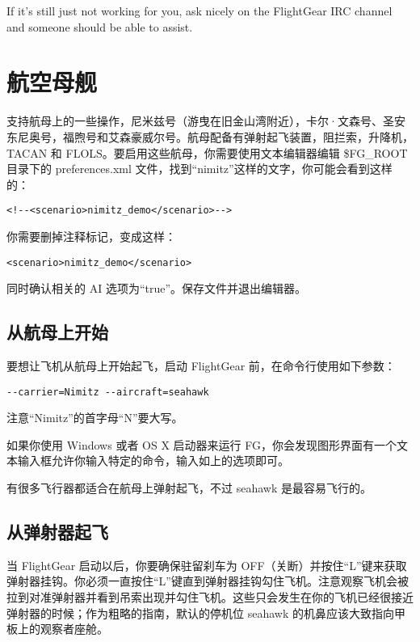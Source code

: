 If it's still just not working for you, ask nicely on the FlightGear IRC channel and someone should be able to assist.
\fi

\ifchinese
\section{航空母舰}\label{carrier}

\FlightGear{} 支持航母上的一些操作，尼米兹号（游曳在旧金山湾附近），卡尔·文森号、圣安东尼奥号，福煦号和艾森豪威尔号。航母配备有弹射起飞装置，阻拦索，升降机，TACAN 和 FLOLS。要启用这些航母，你需要使用文本编辑器编辑 \$FG\_ROOT 目录下的 preferences.xml 文件，找到“nimitz”这样的文字，你可能会看到这样的：

\begin{verbatim}
<!--<scenario>nimitz_demo</scenario>-->
\end{verbatim}

你需要删掉注释标记，变成这样：

\begin{verbatim}
<scenario>nimitz_demo</scenario>
\end{verbatim}

同时确认相关的 AI 选项为“true”。保存文件并退出编辑器。

\subsection{从航母上开始}

要想让飞机从航母上开始起飞，启动 FlightGear 前，在命令行使用如下参数：

\begin{verbatim}
--carrier=Nimitz --aircraft=seahawk
\end{verbatim}

注意“Nimitz”的首字母“N”要大写。

如果你使用 Windows 或者 OS X 启动器来运行 FG，你会发现图形界面有一个文本输入框允许你输入特定的命令，输入如上的选项即可。

有很多飞行器都适合在航母上弹射起飞，不过 seahawk 是最容易飞行的。

\subsection{从弹射器起飞}

当 FlightGear 启动以后，你要确保驻留刹车为 OFF（关断）并按住“L”键来获取弹射器挂钩。你必须一直按住“L”键直到弹射器挂钩勾住飞机。注意观察飞机会被拉到对准弹射器并看到吊索出现并勾住飞机。这些只会发生在你的飞机已经很接近弹射器的时候；作为粗略的指南，默认的停机位 seahawk 的机鼻应该大致指向甲板上的观察者座舱。

